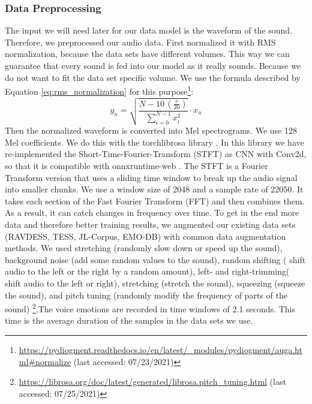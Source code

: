 \subsubsection{Data Preprocessing}
\label{subsubsec:method_vocal_emotion_recognition_data_preprocessing}
The input we will need later for our data model is the waveform of the sound. Therefore, we preprocessed our audio data. First normalized it with RMS normalization, because the data sets have different volumes. This way we can guarantee that every sound is fed into our model as it really sounds. Because we do not want to fit the data set specific volume. We use the formula described by Equation \ref{eq:rms_normalization} for this purpose\footnote{\url{https://pydiogment.readthedocs.io/en/latest/_modules/pydiogment/auga.html#normalize} (last accessed: 07/23/2021)}:
\begin{equation}
\label{eq:rms_normalization}
y_n=\sqrt{\frac{N-10\,(\frac{r}{20})}{\sum_{i=0}^{N-1}{x_i^2}}}\cdot{}x_n
\end{equation}
Then the normalized waveform is converted into Mel spectrograms. We use 128 Mel coefficients. We do this with the torchlibrosa library \cite{kong_panns_2020}. In this library we have re-implemented the Short-Time-Fourier-Transform (STFT) as CNN with Conv2d, so that it is compatible with onnxruntime-web \cite{onnx_runtime_developers_onnx_2021}. The STFT is a Fourier Transform version that uses a sliding time window to break up the audio signal into smaller chunks. We use a window size of 2048 and a sample rate of 22050. It takes each section of the Fast Fourier Transform (FFT) and then combines them. As a result, it can catch changes in frequency over time. To get in the end more data and therefore better training results, we augmented our existing data sets (RAVDESS, TESS, JL-Corpus, EMO-DB) with common data augmentation methods. We used stretching (randomly slow down or speed up the sound), background noise (add some random values to the sound), random shifting ( shift audio to the left or the right by a random amount), left- and right-trimming( shift audio to the left or right), stretching (stretch the sound), squeezing (squeeze the sound), and pitch tuning (randomly modify the frequency of parts of the sound) \footnote{\url{ https://librosa.org/doc/latest/generated/librosa.pitch_tuning.html} (last accessed: 07/25/2021)}.The voice emotions are recorded in time windows of 2.1 seconds. This time is the average duration of the samples in the data sets we use.

